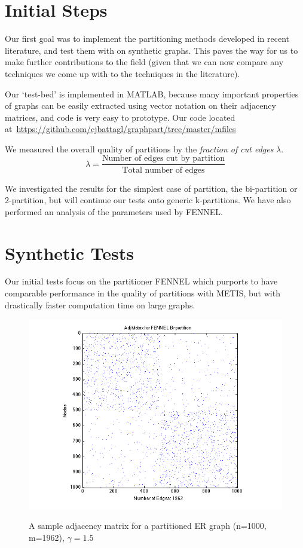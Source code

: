 \documentclass[11pt]{article}
\begin{document}
\section{Initial Steps}
Our first goal was to implement the partitioning methods developed in recent literature, and test them with on synthetic graphs. This paves the way for us to make further contributions to the field (given that we can now compare any techniques we come up with to the techniques in the literature).

Our `test-bed' is implemented in MATLAB, because many important properties of graphs can be easily extracted using vector notation on their adjacency matrices, and code is very easy to prototype. Our code located at~\url{https://github.com/cjbattagl/graphpart/tree/master/mfiles}

We measured the overall quality of partitions by the \textit{fraction of cut edges} $\lambda$.
\[\lambda = \frac{\text{Number of edges cut by partition}}{\text{Total number of edges}}\]

We investigated the results for the simplest case of partition, the bi-partition or 2-partition, but will continue our tests onto generic k-partitions.  
We have also performed an analysis of the parameters used by FENNEL.

\section*{Synthetic Tests} \vspace{-10 pt}
Our initial tests focus on the partitioner FENNEL which purports to have comparable performance in the quality of partitions with METIS, but with drastically faster computation time on large graphs. 

\begin{figure}[ht]
\centering
\caption{A sample adjacency matrix for a partitioned ER graph (n=1000, m=1962), $\gamma = 1.5$}
\includegraphics[scale=.65] {figures/adj_spy.png}
\label{fig:1}
\end{figure}
\end{document}
